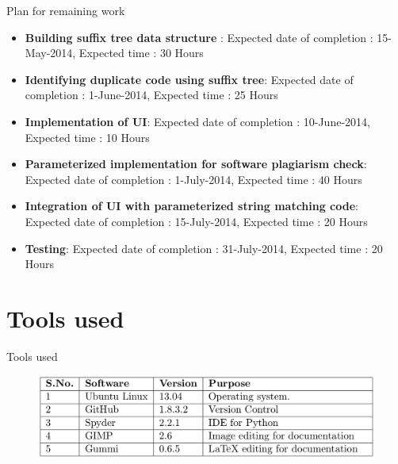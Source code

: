 \documentclass[color=usenames,dvipsnames]{beamer}
\begin{document}
\begin{frame}{Plan for remaining work}

\begin{itemize}
  \setlength{\itemsep}{5pt}

  \item \textbf{Building suffix tree data structure} :
Expected date of completion : 15-May-2014,
Expected time : 30 Hours

\item \textbf{Identifying duplicate code using suffix tree}:
Expected date of completion : 1-June-2014,
Expected time : 25 Hours

\item \textbf{Implementation of UI}:
Expected date of completion : 10-June-2014, 
Expected time : 10 Hours

\item \textbf{Parameterized implementation for software plagiarism
check}:
Expected date of completion : 1-July-2014,
Expected time : 40 Hours

\item \textbf{Integration of UI with parameterized string matching
code}:
Expected date of completion : 15-July-2014,
Expected time : 20 Hours

\item \textbf{Testing}:
Expected date of completion : 31-July-2014,
Expected time : 20 Hours

\end{itemize}

\end{frame}


\section{Tools used}

\begin{frame}{Tools used}

\begin{figure}[h!]  
  \centering
  \includegraphics[width=1\textwidth]{5.png}  
  \end{figure} 
\end{frame}
\end{document}

